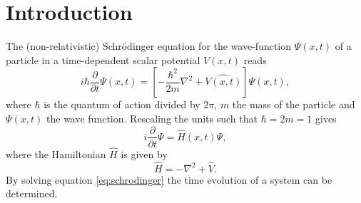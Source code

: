 \section{Introduction}
The (non-relativistic) Schr\"{o}dinger equation for the wave-function $\Psi(x,t)$ of a particle in a time-dependent scalar potential $V(x,t)$ reads 
\[
i\hbar \frac{\partial}{\partial t}\Psi(x,t) = \left[-\frac{\hbar^2}{2m}\nabla^2+\hat{V(x,t)}\right]\Psi(x,t),
\]
where $\hbar$ is the quantum of action divided by $2\pi$, $m$ the mass of the particle and $\Psi(x,t)$ the wave function.
Rescaling the units such that $\hbar = 2m = 1$ gives
\begin{equation}\label{eq:schrodinger}
i \frac{\partial}{\partial t}\Psi = \hat{H}(x,t)\Psi,
\end{equation}where the Hamiltonian $\hat{H}$ is given by
\[
\hat{H} = -\nabla^2+\hat{V}.
\] By solving equation \ref{eq:schrodinger} the time evolution of a system can be determined.